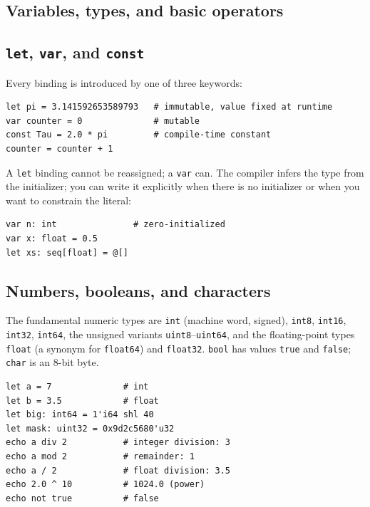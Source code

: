 \documentclass[justified, sixbynine]{tufte-book}
\def\ft{\small\tt}
\theoremstyle{plain}%
\newtheorem * {corollary}{Corollary}
\theoremstyle{definition}
\theoremstyle{remark}
\newtheorem * {remark}{Remark}
\newtheorem * {note}{Note}
\begin{document}
\begin{fullwidth}
\goodbreak\section{Variables, types, and basic operators}

\goodbreak\subsection{{\ft let}, {\ft var}, and {\ft const}}

Every binding is introduced by one of three keywords:

\begin{lstlisting}
let pi = 3.141592653589793   # immutable, value fixed at runtime
var counter = 0              # mutable
const Tau = 2.0 * pi         # compile-time constant
counter = counter + 1
\end{lstlisting}

A {\ft let} binding cannot be reassigned; a {\ft var} can. The compiler infers the type from the initializer; you can write it explicitly when there is no initializer or when you want to constrain the literal:

\begin{lstlisting}
var n: int               # zero-initialized
var x: float = 0.5
let xs: seq[float] = @[]
\end{lstlisting}

\goodbreak\subsection{Numbers, booleans, and characters}


The fundamental numeric types are {\ft int} (machine word, signed), {\ft int8}, {\ft int16}, {\ft int32}, {\ft int64}, the unsigned variants {\ft uint8}--{\ft uint64}, and the floating-point types {\ft float} (a synonym for {\ft float64}) and {\ft float32}. {\ft bool} has values {\ft true} and {\ft false}; {\ft char} is an 8-bit byte.

\begin{lstlisting}
let a = 7              # int
let b = 3.5            # float
let big: int64 = 1'i64 shl 40
let mask: uint32 = 0x9d2c5680'u32
echo a div 2           # integer division: 3
echo a mod 2           # remainder: 1
echo a / 2             # float division: 3.5
echo 2.0 ^ 10          # 1024.0 (power)
echo not true          # false
\end{lstlisting}


\end{fullwidth}
\end{document}
